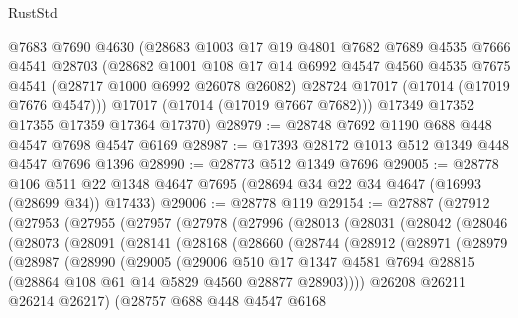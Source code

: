 \begin{lexlean}{RustStd}
\begin{coremodule}
      @7683
      @7690
      @4630
      (@28683
        @1003
        @17
        @19
        @4801
        @7682
        @7689
        @4535
        @7666
        @4541
        @28703
        (@28682
          @1001
          @108
          @17
          @14
          @6992
          @4547
          @4560
          @4535
          @7675
          @4541
          (@28717 @1000 @6992 @26078 @26082)
          @28724
          @17017
          (@17014 (@17019 @7676 @4547)))
        @17017
        (@17014 (@17019 @7667 @7682)))
      @17349
      @17352
      @17355
      @17359
      @17364
      @17370)
@28979 := @28748 @7692 @1190 @688 @448 @4547 @7698 @4547 @6169
@28987 := @17393 @28172 @1013 @512 @1349 @448 @4547 @7696 @1396
@28990 := @28773 @512 @1349 @7696
@29005 := @28778
    @106
    @511
    @22
    @1348
    @4647
    @7695
    (@28694 @34 @22 @34 @4647 (@16993 (@28699 @34)) @17433)
@29006 := @28778 @119
@29154 := @27887
    (@27912
      (@27953
        (@27955
          (@27957
            (@27978
              (@27996
                (@28013
                  (@28031
                    (@28042
                      (@28046
                        (@28073
                          (@28091
                            (@28141
                              (@28168
                                (@28660
                                  (@28744
                                    (@28912
                                      (@28971
                                        (@28979
                                          (@28987
                                            (@28990
                                              (@29005
                                                (@29006
                                                  @510
                                                  @17
                                                  @1347
                                                  @4581
                                                  @7694
                                                  @28815
                                                  (@28864 @108 @61 @14 @5829 @4560 @28877 @28903))))
                                            @26208
                                            @26211
                                            @26214
                                            @26217)
                                          (@28757
                                            @688
                                            @448
                                            @4547
                                            @6168

\end{coremodule}
\end{lexlean}
